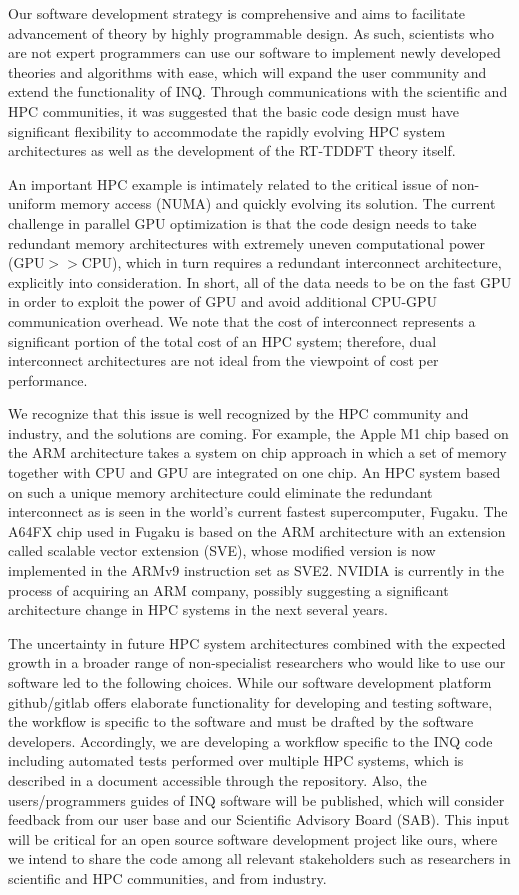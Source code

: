 Our software development strategy is comprehensive and aims to facilitate advancement of theory by highly programmable design. As such, scientists who are not expert programmers can use our software to implement newly developed theories and algorithms with ease, which will expand the user community and extend the functionality of INQ. Through communications with the scientific and HPC communities, it was suggested that the basic code design must have significant flexibility to accommodate the rapidly evolving HPC system architectures as well as the development of the RT-TDDFT theory itself. 

An important HPC example is intimately related to the critical issue of non-uniform memory access (NUMA) and quickly evolving its solution. The current challenge in parallel GPU optimization is that the code design needs to take redundant memory architectures with extremely uneven computational power (GPU$>>$CPU), which in turn requires a redundant interconnect architecture, explicitly into consideration. In short, all of the data needs to be on the fast GPU in order to exploit the power of GPU and avoid additional CPU-GPU communication overhead. We note that the cost of interconnect represents a significant portion of the total cost of an HPC system; therefore, dual interconnect architectures are not ideal from the viewpoint of cost per performance. 

We recognize that this issue is well recognized by the HPC community and industry, and the solutions are coming. For example, the Apple M1 chip based on the ARM architecture takes a system on chip approach in which a set of memory together with CPU and GPU are integrated on one chip. An HPC system based on such a unique memory architecture could eliminate the redundant interconnect as is seen in the world's current fastest supercomputer, Fugaku. The A64FX chip used in Fugaku is based on the ARM architecture with an extension called scalable vector extension (SVE), whose modified version is now implemented in the ARMv9 instruction set as SVE2. NVIDIA is currently in the process of acquiring an ARM company, possibly suggesting a significant architecture change in HPC systems in the next several years.

 The uncertainty in future HPC system architectures combined with the expected growth in a broader range of non-specialist researchers who would like to use our software led to the following choices. While our software development platform github/gitlab offers elaborate functionality for developing and testing software, the workflow is specific to the software and must be drafted by the software developers. Accordingly, we are developing a workflow specific to the INQ code including automated tests performed over multiple HPC systems, which is described in a document accessible through the repository. Also, the users/programmers guides of INQ software will be published, which will consider feedback from our user base and our Scientific Advisory Board (SAB). This input will be critical for an open source software development project like ours, where we intend to share the code among all relevant stakeholders such as researchers in scientific and HPC communities, and from industry.
 
